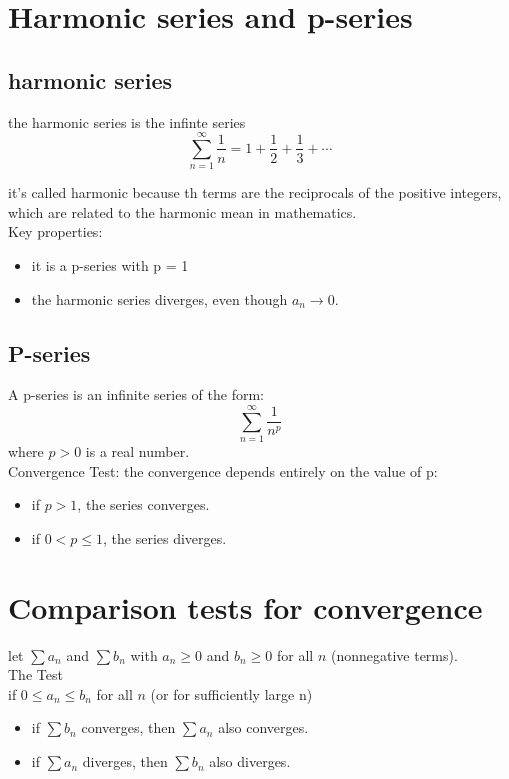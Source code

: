 \documentclass{article}
\begin{document}
                    \section{Harmonic series and p-series}
                          \subsection{harmonic series}
                            the harmonic series is the infinte series 
                                \[\sum_{n=1}^{\infty} \frac{1}{n} = 1 + \frac{1}{2} + \frac{1}{3} + \cdots\]
                    
                            it's called harmonic because th terms are the reciprocals of the positive integers, which are related to the harmonic mean in  mathematics.\\ 
                            Key properties: 
                            \begin{itemize}
                                \item it is a p-series with p = 1
                                \item the harmonic series diverges, even though \(a_n \rightarrow 0\).
                            \end{itemize}  
                          \subsection{P-series}
                            A p-series is an infinite series of the form: 
                                    \[\sum_{n = 1}^{\infty} \frac{1}{n^p}\]  
                            where \(p > 0\) is a real number.\\ 
                            Convergence Test: 
                            the convergence depends entirely on the value of p: 
                            \begin{itemize}
                                \item if \(p > 1\), the series converges. 
                                \item if \(0 < p \leq 1\), the series diverges.
                            \end{itemize}
                    \section{Comparison tests for convergence}
                            let \(\sum a_n \) and \(\sum b_n\) with \(a_n \geq 0 \) and \(b_n \geq 0\) for all \(n\) (nonnegative terms).\\
                            The Test\\
                            if \(0 \leq a_n \leq b_n\) for all \(n\) (or for sufficiently large n)
                            \begin{itemize}
                                \item if \(\sum b_n\) converges, then \(\sum a_n\) also converges. 
                                \item if \(\sum a_n\) diverges, then \(\sum b_n\) also diverges. 
                            \end{itemize}
\end{document}
